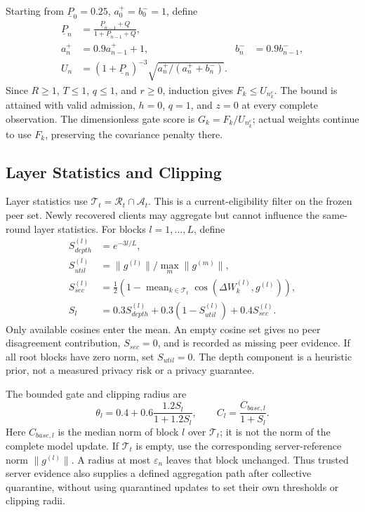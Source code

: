 \documentclass[conference,compsoc]{IEEEtran}
\begin{document}
Starting from $\underline P_0=0.25$, $a_0^+=b_0^-=1$, define
\begin{align}
    \underline P_n & =\frac{\underline P_{n-1}+Q}{1+\underline P_{n-1}+Q},                          \\
    a_n^+          & =0.9a_{n-1}^++1,                                      & b_n^- & =0.9b_{n-1}^-, \\
    U_n            & =(1+\underline P_n)^{-3}
    \sqrt{a_n^+/(a_n^++b_n^-)}.
\end{align}
Since $R\ge1$, $T\le1$, $q\le1$, and $r\ge0$, induction gives $F_k\le U_{n_k^e}$.
The bound is attained with valid admission, $h=0$, $q=1$, and $z=0$ at every
complete observation. The dimensionless gate score is $G_k=F_k/U_{n_k^e}$;
actual weights continue to use $F_k$, preserving the covariance penalty there.

\subsection{Layer Statistics and Clipping}

Layer statistics use $\mathcal T_t=\mathcal R_t\cap\mathcal A_t$. This is a
current-eligibility filter on the frozen peer set. Newly recovered clients may
aggregate but cannot influence the same-round layer statistics. For blocks
$l=1,\ldots,L$, define
\begin{align}
    S_{depth}^{(l)} & =e^{-3l/L},                                                 \\
    S_{util}^{(l)}  & =\|g^{(l)}\|/\max_m\|g^{(m)}\|,                             \\
    S_{sec}^{(l)}   & =\tfrac12(1-\operatorname{mean}_{k\in\mathcal T_t}
    \cos(\Delta W_k^{(l)},g^{(l)})),                                              \\
    S_l             & =0.3S_{depth}^{(l)}+0.3(1-S_{util}^{(l)})+0.4S_{sec}^{(l)}.
\end{align}
Only available cosines enter the mean. An empty cosine set gives no peer
disagreement contribution, $S_{sec}=0$, and is recorded as missing peer evidence.
If all root blocks have zero norm, set $S_{util}=0$.
The depth component is a heuristic prior, not a measured privacy risk or a
privacy guarantee.

The bounded gate and clipping radius are
\begin{equation}
    \theta_l=0.4+0.6\frac{1.2S_l}{1+1.2S_l},\qquad
    C_l=\frac{C_{base,l}}{1+S_l}.
\end{equation}
Here $C_{base,l}$ is the median norm of block $l$ over $\mathcal T_t$;
it is not the norm of the complete model update. If $\mathcal T_t$ is empty,
use the corresponding server-reference norm $\|g^{(l)}\|$. A radius at most
$\varepsilon_n$ leaves that block unchanged. Thus trusted server evidence also
supplies a defined aggregation path after collective quarantine, without
using quarantined updates to set their own thresholds or clipping radii.
\end{document}
